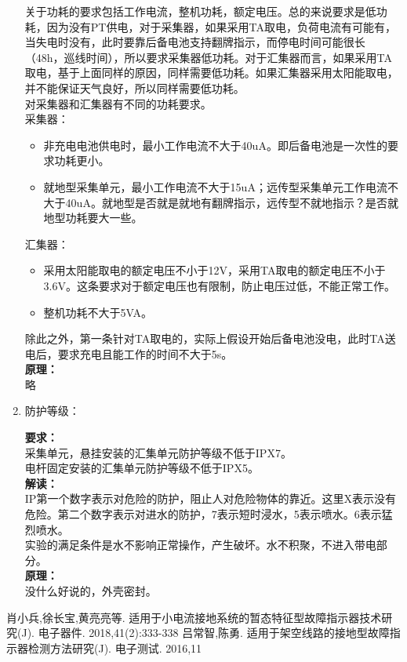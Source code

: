 \documentclass{article}
\begin{document}
\begin{CJK}{UTF8}{gbsn}
\begin{enumerate}
	关于功耗的要求包括工作电流，整机功耗，额定电压。总的来说要求是低功耗，因为没有PT供电，对于采集器，如果采用TA取电，负荷电流有可能有，当失电时没有，此时要靠后备电池支持翻牌指示，而停电时间可能很长（48h，巡线时间），所以要求采集器低功耗。对于汇集器而言，如果采用TA取电，基于上面同样的原因，同样需要低功耗。如果汇集器采用太阳能取电，并不能保证天气良好，所以同样需要低功耗。\\
	对采集器和汇集器有不同的功耗要求。\\
	采集器：
	\begin{itemize}
			\item 非充电电池供电时，最小工作电流不大于40uA。即后备电池是一次性的要求功耗更小。
			\item 就地型采集单元，最小工作电流不大于15uA；远传型采集单元工作电流不大于40uA。就地型是否就是就地有翻牌指示，远传型不就地指示？是否就地型功耗要大一些。
	\end{itemize}
	汇集器：
	\begin{itemize}
			\item 采用太阳能取电的额定电压不小于12V，采用TA取电的额定电压不小于3.6V。这条要求对于额定电压也有限制，防止电压过低，不能正常工作。
			\item 整机功耗不大于5VA。
	\end{itemize}
	除此之外，第一条针对TA取电的，实际上假设开始后备电池没电，此时TA送电后，要求充电且能工作的时间不大于5s。\\
	\textbf{原理：}\\
	略
\item 防护等级：
	\par
	\textbf{要求：}\\
	采集单元，悬挂安装的汇集单元防护等级不低于IPX7。\\
	电杆固定安装的汇集单元防护等级不低于IPX5。\\
	\textbf{解读：}\\
	IP第一个数字表示对危险的防护，阻止人对危险物体的靠近。这里X表示没有危险。第二个数字表示对进水的防护，7表示短时浸水，5表示喷水。6表示猛烈喷水。\\
	实验的满足条件是水不影响正常操作，产生破坏。水不积聚，不进入带电部分。\\
	\textbf{原理：}\\
	没什么好说的，外壳密封。
	
	\end{enumerate}
\begin{thebibliography}{99}
肖小兵,徐长宝,黄亮亮等. 适用于小电流接地系统的暂态特征型故障指示器技术研究(J). 电子器件. 2018,41(2):333-338
吕常智,陈勇. 适用于架空线路的接地型故障指示器检测方法研究(J). 电子测试. 2016,11
\end{thebibliography}
\end{CJK}
\end{document}
